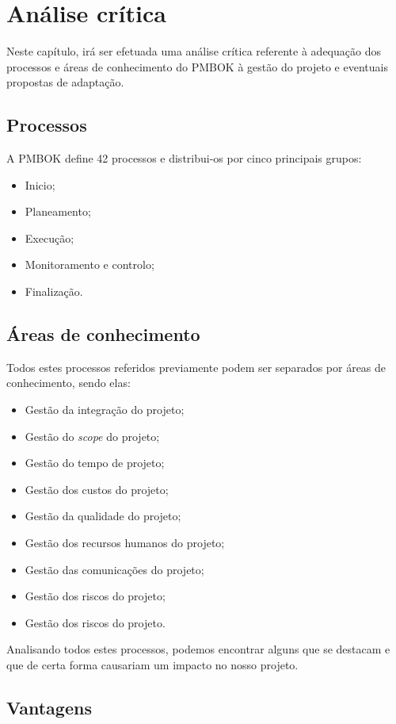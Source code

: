 \section{Análise crítica}
Neste capítulo, irá ser efetuada uma análise crítica referente à adequação dos processos e áreas de conhecimento do PMBOK à gestão do projeto e eventuais propostas de adaptação.

\subsection{Processos}
A PMBOK define 42 processos e distribui-os por cinco principais grupos:
\begin{itemize}
    \item Inicio;
    \item Planeamento;
    \item Execução;
    \item Monitoramento e controlo;
    \item Finalização.
\end{itemize}

\subsection{Áreas de conhecimento}
Todos estes processos referidos previamente podem ser separados por áreas de conhecimento, sendo elas:
\begin{itemize}
    \item Gestão da integração do projeto;
    \item Gestão do \textit{scope} do projeto;
    \item Gestão do tempo de projeto;
    \item Gestão dos custos do projeto;
    \item Gestão da qualidade do projeto;
    \item Gestão dos recursos humanos do projeto;
    \item Gestão das comunicações do projeto;
    \item Gestão dos riscos do projeto;
    \item Gestão dos riscos do projeto.
\end{itemize}

Analisando todos estes processos, podemos encontrar alguns que se destacam e que de certa forma causariam um impacto no nosso projeto.

\clearpage

\subsection{Vantagens}


